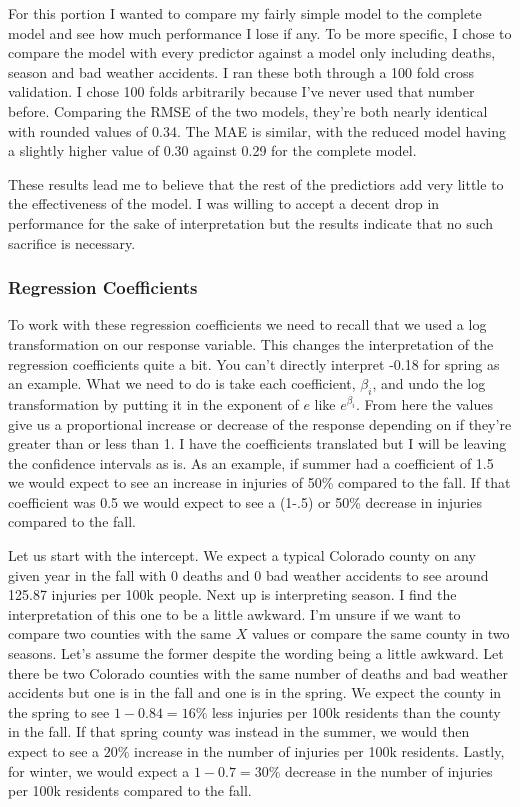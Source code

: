 For this portion I wanted to compare my fairly simple model to the complete model and see how much performance I lose if any. To be more specific, I chose to compare the model with every predictor against a model only including deaths, season and bad weather accidents. I ran these both through a 100 fold cross validation. I chose 100 folds arbitrarily because I've never used that number before. Comparing the RMSE of the two models, they're both nearly identical with rounded values of 0.34. The MAE is similar, with the reduced model having a slightly higher value of 0.30 against 0.29 for the complete model.

These results lead me to believe that the rest of the predictiors add very little to the effectiveness of the model. I was willing to accept a decent drop in performance for the sake of interpretation but the results indicate that no such sacrifice is necessary. 

\subsubsection*{Regression Coefficients}




To work with these regression coefficients we need to recall that we used a log transformation on our response variable. This changes the interpretation of the regression coefficients quite a bit. You can't directly interpret -0.18 for spring as an example. What we need to do is take each coefficient, $\beta_i$, and undo the log transformation by putting it in the exponent of $e$ like $e^{\beta_i}$. From here the values give us a proportional increase or decrease of the response depending on if they're greater than or less than 1. I have the coefficients translated but I will be leaving the confidence intervals as is. As an example, if summer had a coefficient of 1.5 we would expect to see an increase in injuries of 50\% compared to the fall. If that coefficient was 0.5 we would expect to see a (1-.5) or 50\% decrease in injuries compared to the fall.  

Let us start with the intercept. We expect a typical Colorado county on any given year in the fall with 0 deaths and 0 bad weather accidents to see around 125.87 injuries per 100k people. Next up is interpreting season. I find the interpretation of this one to be a little awkward. I'm unsure if we want to compare two counties with the same $X$ values or compare the same county in two seasons. Let's assume the former despite the wording being a little awkward. Let there be two Colorado counties with the same number of deaths and bad weather accidents but one is in the fall and one is in the spring. We expect the county in the spring to see $1-0.84=16\%$ less injuries per 100k residents than the county in the fall. If that spring county was instead in the summer, we would then expect to see a $20\%$ increase in the number of injuries per 100k residents. Lastly, for winter, we would expect a $1-0.7=30\%$ decrease in the number of injuries per 100k residents compared to the fall. 

